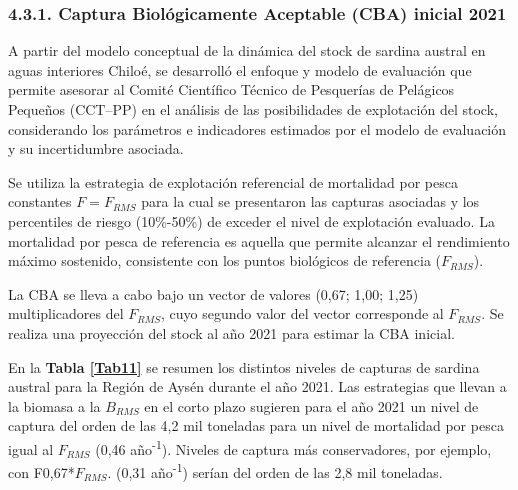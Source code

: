 \documentclass[
  spanish,
]{article}
\begin{document}
\hypertarget{captura-bioluxf3gicamente-aceptable-cba-inicial-2021}{%
\subsubsection{4.3.1. Captura Biológicamente Aceptable (CBA) inicial
2021}\label{captura-bioluxf3gicamente-aceptable-cba-inicial-2021}}

A partir del modelo conceptual de la dinámica del stock de sardina
austral en aguas interiores Chiloé, se desarrolló el enfoque y modelo de
evaluación que permite asesorar al Comité Científico Técnico de
Pesquerías de Pelágicos Pequeños (CCT--PP) en el análisis de las
posibilidades de explotación del stock, considerando los parámetros e
indicadores estimados por el modelo de evaluación y su incertidumbre
asociada.

Se utiliza la estrategia de explotación referencial de mortalidad por
pesca constantes \(F=F_{RMS}\) para la cual se presentaron las capturas
asociadas y los percentiles de riesgo (10\%-50\%) de exceder el nivel de
explotación evaluado. La mortalidad por pesca de referencia es aquella
que permite alcanzar el rendimiento máximo sostenido, consistente con
los puntos biológicos de referencia (\(F_{RMS}\)).

La CBA se lleva a cabo bajo un vector de valores (0,67; 1,00; 1,25)
multiplicadores del \(F_{RMS}\), cuyo segundo valor del vector
corresponde al \(F_{RMS}\). Se realiza una proyección del stock al año
2021 para estimar la CBA inicial.

En la \textbf{Tabla \ref{Tab11}} se resumen los distintos niveles de
capturas de sardina austral para la Región de Aysén durante el año 2021.
Las estrategias que llevan a la biomasa a la \(B_{RMS}\) en el corto
plazo sugieren para el año 2021 un nivel de captura del orden de las 4,2
mil toneladas para un nivel de mortalidad por pesca igual al \(F_{RMS}\)
(0,46 año\textsuperscript{-1}). Niveles de captura más conservadores,
por ejemplo, con F0,67*\(F_{RMS}\). (0,31 año\textsuperscript{-1})
serían del orden de las 2,8 mil toneladas.

\vspace{0.5cm}
\end{document}
